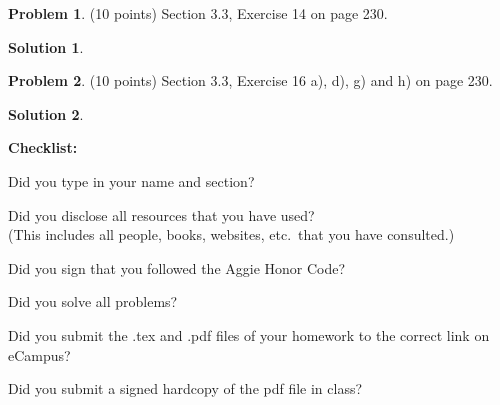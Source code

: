 \documentclass{article}
\theoremstyle{definition}
\newtheorem{problem}{Problem}
\newtheorem*{solution}{Solution}
\newcommand{\checklist}{\noindent\textbf{Checklist:}
\begin{compactitem}[$\Box$] 
\item Did you type in your name and section? 
\item Did you disclose all resources that you have used? \\
(This includes all people, books, websites, etc.\ that you have consulted.)
\item Did you sign that you followed the Aggie Honor Code? 
\item Did you solve all problems? 
\item Did you submit the .tex and .pdf files of your homework to the correct link on eCampus?
\item Did you submit a signed hardcopy of the pdf file in class? 
\end{compactitem}
}
\begin{document}
\begin{problem} (10 points) Section 3.3, Exercise 14 on page 230.
\end{problem}
\begin{solution}
\end{solution}

\begin{problem} (10 points) Section 3.3, Exercise 16 a), d), g) and h) on page 230.
\end{problem}
\begin{solution}
\end{solution}

\goodbreak
\checklist
\end{document}
